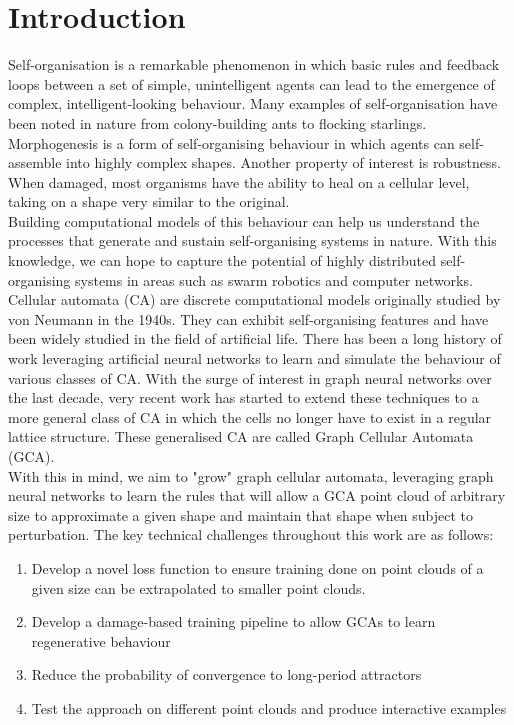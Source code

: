 \chapter{Introduction}

Self-organisation is a remarkable phenomenon in which basic rules and feedback loops between a set of simple, unintelligent agents can lead to the emergence of complex, intelligent-looking behaviour. Many examples of self-organisation have been noted in nature from colony-building ants to flocking starlings. Morphogenesis is a form of self-organising behaviour in which agents can self-assemble into highly complex shapes. Another property of interest is robustness. When damaged, most organisms have the ability to heal on a cellular level, taking on a shape very similar to the original. \\

Building computational models of this behaviour can help us understand the processes that generate and sustain self-organising systems in nature. With this knowledge, we can hope to capture the potential of highly distributed self-organising systems in areas such as swarm robotics and computer networks. \\

Cellular automata (CA) are discrete computational models originally studied by von Neumann in the 1940s. They can exhibit self-organising features and have been widely studied in the field of artificial life. There has been a long history of work leveraging artificial neural networks to learn and simulate the behaviour of various classes of CA. With the surge of interest in graph neural networks over the last decade, very recent work has started to extend these techniques to a more general class of CA in which the cells no longer have to exist in a regular lattice structure. These generalised CA are called Graph Cellular Automata (GCA). \\

With this in mind, we aim to "grow" graph cellular automata, leveraging graph neural networks to learn the rules that will allow a GCA point cloud of arbitrary size to approximate a given shape and maintain that shape when subject to perturbation. The key technical challenges throughout this work are as follows:

\begin{enumerate}
    \item Develop a novel loss function to ensure training done on point clouds of a given size can be extrapolated to smaller point clouds.
    \item Develop a damage-based training pipeline to allow GCAs to learn regenerative behaviour
    \item Reduce the probability of convergence to long-period attractors
    \item Test the approach on different point clouds and produce interactive examples
\end{enumerate}
